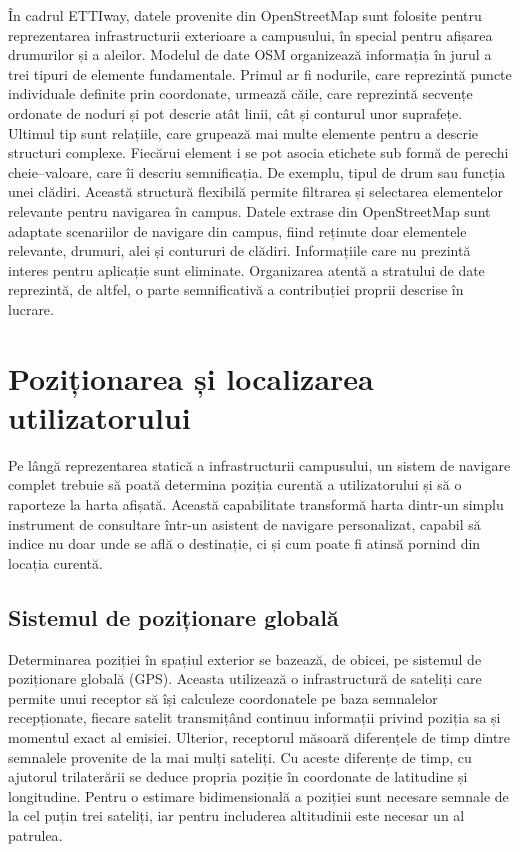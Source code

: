 În cadrul ETTIway, datele provenite din OpenStreetMap sunt folosite pentru
reprezentarea infrastructurii exterioare a campusului, în special pentru
afișarea drumurilor și a aleilor. Modelul de date OSM organizează informația în
jurul a trei tipuri de elemente fundamentale. Primul ar fi  nodurile, care reprezintă puncte
individuale definite prin coordonate, urmează căile, care reprezintă secvențe ordonate de
noduri și pot descrie atât linii, cât și conturul unor suprafețe. Ultimul tip sunt relațiile,
care grupează mai multe elemente pentru a descrie structuri complexe. Fiecărui
element i se pot asocia etichete sub formă de perechi cheie–valoare, care îi
descriu semnificația. De exemplu, tipul de drum sau funcția unei clădiri.
Această structură flexibilă permite filtrarea și selectarea elementelor
relevante pentru navigarea în campus. Datele extrase din OpenStreetMap sunt
adaptate scenariilor de navigare din campus, fiind reținute doar elementele
relevante, drumuri, alei și contururi de clădiri. Informațiile care nu prezintă interes pentru aplicație sunt eliminate. Organizarea atentă a stratului de
date reprezintă, de altfel, o parte semnificativă a contribuției proprii
descrise în lucrare.

\section{Poziționarea și localizarea utilizatorului}
\label{sec:pozitionare}

Pe lângă reprezentarea statică a infrastructurii campusului, un sistem de
navigare complet trebuie să poată determina poziția curentă a utilizatorului și
să o raporteze la harta afișată. Această capabilitate transformă harta dintr-un
simplu instrument de consultare într-un asistent de navigare personalizat, capabil
să indice nu doar unde se află o destinație, ci și cum poate fi atinsă pornind
din locația curentă.

\subsection{Sistemul de poziționare globală}
\label{subsec:gps}

Determinarea poziției în spațiul exterior se bazează, de obicei, pe sistemul
de poziționare globală (GPS). Aceasta utilizează o infrastructură de sateliți care permite unui
receptor să își calculeze coordonatele pe baza semnalelor recepționate, fiecare
satelit transmițând continuu informații privind poziția sa și momentul exact al
emisiei. Ulterior, receptorul măsoară diferențele de timp dintre semnalele provenite de la
mai mulți sateliți. Cu aceste diferențe de timp, cu ajutorul trilaterării se deduce propria poziție în coordonate de
latitudine și longitudine. Pentru o estimare bidimensională a poziției sunt
necesare semnale de la cel puțin trei sateliți, iar pentru includerea altitudinii
este necesar un al patrulea\cite{SEOS_GPS}.

